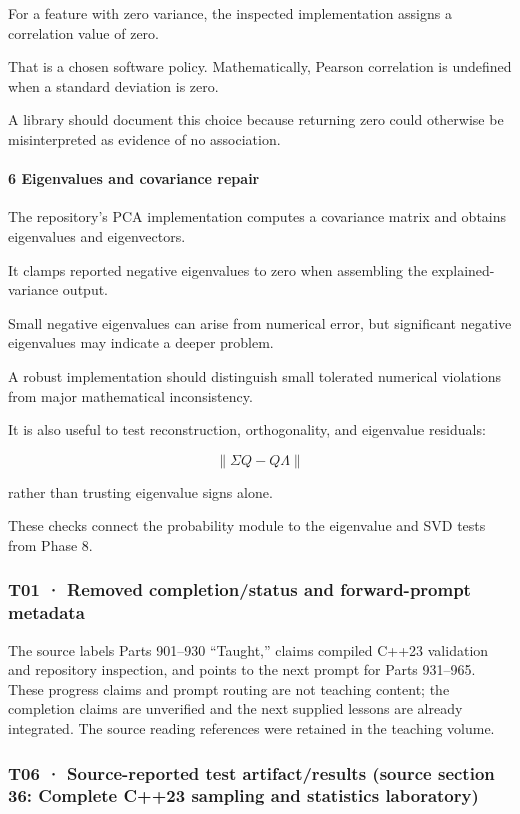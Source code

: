 For a feature with zero variance, the inspected implementation assigns a correlation value of zero.

That is a chosen software policy. Mathematically, Pearson correlation is undefined when a standard deviation is zero.

A library should document this choice because returning zero could otherwise be misinterpreted as evidence of no association.

\paragraph{6 Eigenvalues and covariance repair}\label{02-foundations-ii-ch039-eigenvalues-and-covariance-repair}

The repository's PCA implementation computes a covariance matrix and obtains eigenvalues and eigenvectors.

It clamps reported negative eigenvalues to zero when assembling the explained-variance output.

Small negative eigenvalues can arise from numerical error, but significant negative eigenvalues may indicate a deeper problem.

A robust implementation should distinguish small tolerated numerical violations from major mathematical inconsistency.

It is also useful to test reconstruction, orthogonality, and eigenvalue residuals:

\[
 \|\Sigma Q-Q\Lambda\|
\]

rather than trusting eigenvalue signs alone.

These checks connect the probability module to the eigenvalue and SVD tests from Phase 8.

\subsubsection{T01 · Removed completion/status and forward-prompt metadata}\label{02-foundations-ii-ch039-t01-removed-completionstatus-and-forward-prompt-metadata}

The source labels Parts 901--930 ``Taught,'' claims compiled C++23 validation and repository inspection, and points to the next prompt for Parts 931--965. These progress claims and prompt routing are not teaching content; the completion claims are unverified and the next supplied lessons are already integrated. The source reading references were retained in the teaching volume.

\subsubsection{T06 · Source-reported test artifact/results (source section 36: Complete C++23 sampling and statistics laboratory)}\label{02-foundations-ii-ch039-t06-source-reported-test-artifactresults-source-section-36-complete-c23-sampling-and-statistics-laboratory}

